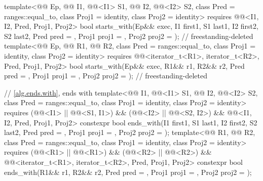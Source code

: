 \begin{codeblock}
{{    template<@@ Ep, @@ I1, @@<I1> S1,
             @@ I2, @@<I2> S2,
             class Pred = ranges::equal_to, class Proj1 = identity, class Proj2 = identity>
      requires @@<I1, I2, Pred, Proj1, Proj2>
      bool starts_with(Ep&& exec, I1 first1, S1 last1, I2 first2, S2 last2,
                       Pred pred = {}, Proj1 proj1 = {}, Proj2 proj2 = {}); // freestanding-deleted
    template<@@ Ep, @@ R1,
             @@ R2, class Pred = ranges::equal_to,
             class Proj1 = identity, class Proj2 = identity>
      requires @@<iterator_t<R1>, iterator_t<R2>, Pred, Proj1, Proj2>
      bool starts_with(Ep&& exec, R1&& r1, R2&& r2,
                       Pred pred = {}, Proj1 proj1 = {}, Proj2 proj2 = {}); // freestanding-deleted

    // \ref{alg.ends.with}, ends with
    template<@@ I1, @@<I1> S1, @@ I2, @@<I2> S2,
             class Pred = ranges::equal_to, class Proj1 = identity, class Proj2 = identity>
      requires (@@<I1> || @@<S1, I1>) &&
               (@@<I2> || @@<S2, I2>) &&
               @@<I1, I2, Pred, Proj1, Proj2>
      constexpr bool ends_with(I1 first1, S1 last1, I2 first2, S2 last2, Pred pred = {},
                               Proj1 proj1 = {}, Proj2 proj2 = {});
    template<@@ R1, @@ R2, class Pred = ranges::equal_to,
             class Proj1 = identity, class Proj2 = identity>
      requires (@@<R1> || @@<R1>) &&
               (@@<R2> || @@<R2>) &&
               @@<iterator_t<R1>, iterator_t<R2>, Pred, Proj1, Proj2>
      constexpr bool ends_with(R1&& r1, R2&& r2, Pred pred = {},
                               Proj1 proj1 = {}, Proj2 proj2 = {});

}}
\end{codeblock}
